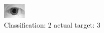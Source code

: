 \begin{figure}[h!]
\begin{center}
\includegraphics[width=0.60\columnwidth]{figures/ID1045_class_2_target_3.png}
\end{center}
\caption{ Classification: 2 actual target: 3}
\label{fig:ID1045_class_2_target_3}
\end{figure}
